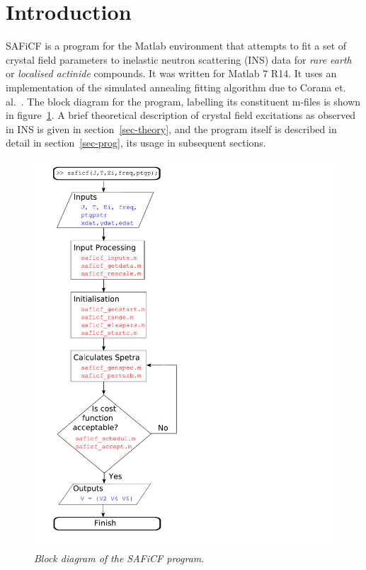\documentclass[12pt,onecolumn,tightenlines,aps,amsmath,floatfix,notitlepage,nofootinbib]{revtex4}
\begin{document}
\section{Introduction} \label{sec-intro}

SAFiCF is a program for the Matlab environment that attempts to fit a set of crystal field parameters to inelastic neutron scattering (INS) data for \emph{rare earth} or \emph{localised actinide} compounds. It was written for Matlab 7 R14. It uses an implementation of the simulated annealing fitting algorithm due to Corana et. al.~\cite{CMMR87}. The block diagram for the program, labelling its constituent m-files is shown in figure~\ref{fg:block}. A brief theoretical description of crystal field excitations as observed in INS is given in section~\ref{sec-theory}, and the program itself is described in detail in section~\ref{sec-prog}, its usage in subsequent sections. 

\begin{figure}
  \begin{center}
    \includegraphics[width=\textwidth]{figs/block.pdf}
    \caption{\emph{Block diagram of the SAFiCF program}.} \label{fg:block}
  \end{center}
\end{figure}
\end{document}
